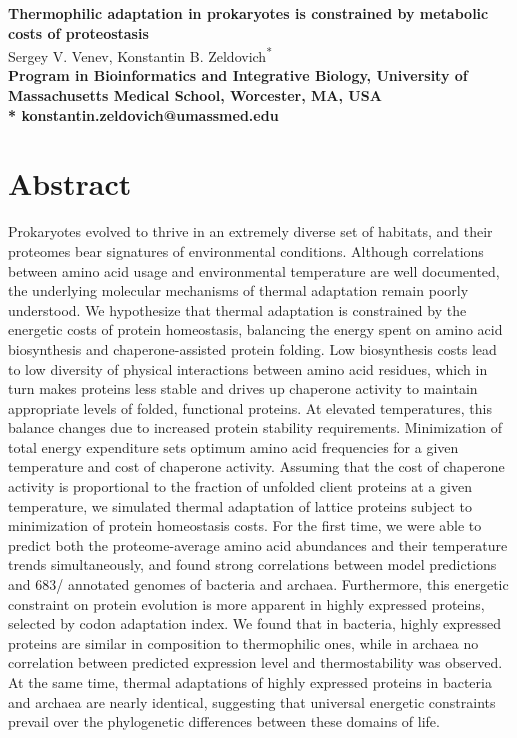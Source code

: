\documentclass[10pt,letterpaper]{article}
\date{}
\newcommand{\ARCHBACTERTOTAL}{683}
\begin{document}
\vspace*{0.35in}


\begin{flushleft}
{\Large
\textbf{Thermophilic adaptation in prokaryotes is constrained by metabolic costs of proteostasis}
}
\newline
\\
Sergey V. Venev, 
Konstantin B. Zeldovich\textsuperscript{*}
\\
\bigskip
\bf{} Program in Bioinformatics and Integrative Biology, University of Massachusetts Medical School, Worcester, MA, USA
\\
\bigskip
* konstantin.zeldovich@umassmed.edu
\end{flushleft}

\section*{Abstract}
Prokaryotes evolved to thrive in an extremely diverse set of habitats, and their proteomes bear signatures of environmental conditions. Although correlations between amino acid usage and environmental temperature are well documented, the underlying molecular mechanisms of thermal adaptation remain poorly understood. We hypothesize that thermal adaptation is constrained by the energetic costs of protein homeostasis, balancing the energy spent on amino acid biosynthesis and chaperone-assisted protein folding. Low biosynthesis costs lead to low diversity of physical interactions between amino acid residues, which in turn makes proteins less stable and drives up chaperone activity to maintain appropriate levels of folded, functional proteins. At elevated temperatures, this balance changes due to increased protein stability requirements. Minimization of total energy expenditure sets optimum amino acid frequencies for a given temperature and cost of chaperone activity. Assuming that the cost of chaperone activity is proportional to the fraction of unfolded client proteins at a given temperature, we simulated thermal adaptation of lattice proteins subject to minimization of protein homeostasis costs. For the first time, we were able to predict both the proteome-average amino acid abundances and their temperature trends simultaneously, and found strong correlations between model predictions and \ARCHBACTERTOTAL/ annotated genomes of bacteria and archaea. Furthermore, this energetic constraint on protein evolution is more apparent in highly expressed proteins, selected by codon adaptation index. We found that in bacteria, highly expressed proteins are similar in composition to thermophilic ones, while in archaea no correlation between predicted expression level and thermostability was observed.
At the same time, thermal adaptations of highly expressed proteins in bacteria and archaea are nearly identical, suggesting that universal energetic constraints prevail over the phylogenetic differences between these domains of life.
\end{document}
